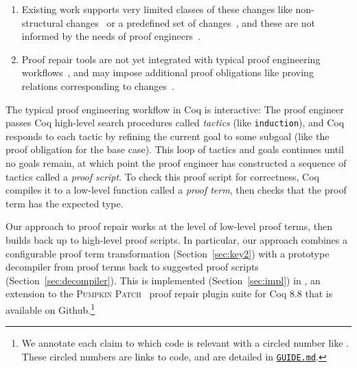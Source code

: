 \begin{enumerate}
\item Existing work supports very limited classes of these changes like non-structural changes~\cite{pumpkinpatch} or a predefined set
of changes~\cite{robert2018, wibergh2019}, and these are not informed by the needs of proof engineers~\cite{replica}.
\item Proof repair tools are not yet integrated with typical proof engineering workflows~\cite{PGL-045, pumpkinpatch, robert2018},
and may impose additional proof obligations like proving relations corresponding to changes~\cite{Ringer2019}.
\end{enumerate}

The typical proof engineering workflow in Coq is interactive:
The proof engineer passes Coq high-level search procedures called \textit{tactics} (like \lstinline{induction}),
and Coq responds to each tactic by refining the current goal to some subgoal (like the proof obligation for the base case).
This loop of tactics and goals continues until no goals remain, at which point the proof engineer 
has constructed a sequence of tactics called a \textit{proof script}.
To check this proof script for correctness, Coq compiles it to a low-level function called a \textit{proof term},
then checks that the proof term has the expected type.

Our approach to proof repair works at the level of low-level proof terms, then builds back up to high-level proof scripts.
In particular, our approach combines a configurable proof term transformation (Section~\ref{sec:key2}) with a prototype decompiler from proof terms
back to suggested proof scripts (Section~\ref{sec:decompiler}). %
This is implemented (Section~\ref{sec:impl}) in \toolname, an extension to the \textsc{Pumpkin Patch}~\cite{pumpkinpatch} proof repair plugin suite for Coq 8.8 that is available on Github.\footnote{We annotate each claim to which code is relevant with a circled number like . These circled numbers are links to code, and are detailed in \href{https://github.com/uwplse/pumpkin-pi/blob/silent/GUIDE.md}{\lstinline{GUIDE.md}}.} %


